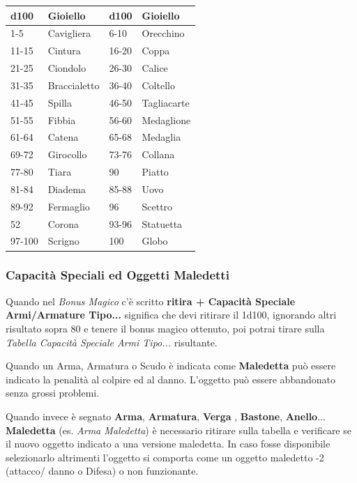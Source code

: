 \begin{multicols}{2}
{\begin{tabularx}{\linewidth}{X|l|X|l}
		\toprule
\rowcolor{gray!20}\textbf{d100} & \textbf{Gioiello} & \textbf{d100} & \textbf{Gioiello}\\
\toprule
1-5 & Cavigliera & 6-10 & Orecchino \\
\rowcolor{gray!20}11-15 & Cintura& 16-20 & Coppa\\
21-25 & Ciondolo& 26-30 & Calice\\
\rowcolor{gray!20}31-35 & Braccialetto& 36-40 & Coltello\\
41-45 & Spilla& 46-50 & Tagliacarte\\
\rowcolor{gray!20}51-55 & Fibbia& 56-60 & Medaglione\\
61-64 & Catena& 65-68 & Medaglia\\
\rowcolor{gray!20}69-72 & Girocollo& 73-76 & Collana\\
77-80 & Tiara& 90& Piatto\\
\rowcolor{gray!20}81-84 & Diadema& 85-88 & Uovo\\
89-92 & Fermaglio& 96 & Scettro\\
\rowcolor{gray!20}52    & Corona& 93-96 & Statuetta\\
97-100 & Scrigno& 100 & Globo
\end{tabularx}

\subsubsection{Capacità Speciali ed Oggetti Maledetti}

Quando nel \emph{Bonus Magico} c'è scritto \textbf{ritira + Capacità Speciale Armi/Armature Tipo...} significa che devi ritirare il 1d100, ignorando altri risultato sopra 80 e tenere il bonus magico ottenuto, poi potrai tirare sulla \emph{Tabella Capacità Speciale Armi Tipo...} risultante.

Quando un Arma, Armatura o Scudo è indicata come \textbf{Maledetta} può essere indicato la penalità al colpire ed al danno. L'oggetto può essere abbandonato senza grossi problemi.

Quando invece è segnato \textbf{Arma}, \textbf{Armatura}, \textbf{Verga} , \textbf{Bastone}, \textbf{Anello}... \textbf{Maledetta} (es. \emph{Arma Maledetta}) è necessario ritirare sulla tabella e verificare se il nuovo oggetto indicato a una versione maledetta. In caso fosse disponibile selezionarlo altrimenti l'oggetto si comporta come un oggetto maledetto -2 (attacco/ danno o Difesa) o non funzionante.\hypertarget{Arma Maledetta}{}\hypertarget{Maledetta}{}\hypertarget{Armatura Maledetta}{}

}
\end{multicols}
